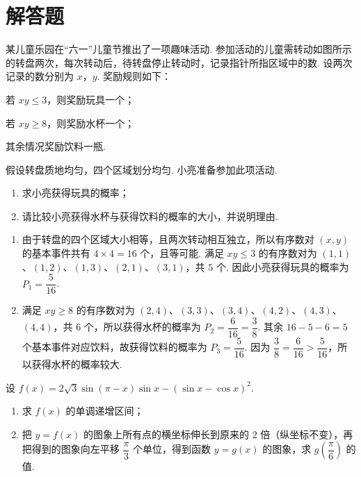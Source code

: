\section{解答题}

\begin{problem}
某儿童乐园在“六一”儿童节推出了一项趣味活动. 参加活动的儿童需转动如图所示的转盘两次，每次转动后，待转盘停止转动时，记录指针所指区域中的数. 设两次记录的数分别为 \(x\)，\(y\). 奖励规则如下：

\begin{circlelist}
\item 若 \(xy\leq 3\)，则奖励玩具一个；
\item 若 \(xy\geq 8\)，则奖励水杯一个；
\item 其余情况奖励饮料一瓶.
\end{circlelist}

假设转盘质地均匀，四个区域划分均匀. 小亮准备参加此项活动.

\begin{enumerate}
\item 求小亮获得玩具的概率；
\item 请比较小亮获得水杯与获得饮料的概率的大小，并说明理由.
\end{enumerate}

\begingroup
\leftskip=0pt\relax
{}
\endgroup
\end{problem}

\begin{solution}
\begin{enumerate}
\item 由于转盘的四个区域大小相等，且两次转动相互独立，所以有序数对 \((x,y)\) 的基本事件共有 \(4\times4=16\) 个，且等可能. 满足 \(xy\leq3\) 的有序数对为 \((1,1)\)、\((1,2)\)、\((1,3)\)、\((2,1)\)、\((3,1)\)，共 \(5\) 个. 因此小亮获得玩具的概率为 \(P_1=\dfrac5{16}\).
\item 满足 \(xy\geq8\) 的有序数对为 \((2,4)\)、\((3,3)\)、\((3,4)\)、\((4,2)\)、\((4,3)\)、\((4,4)\)，共 \(6\) 个，所以获得水杯的概率为 \(P_2=\dfrac6{16}=\dfrac38\). 其余 \(16-5-6=5\) 个基本事件对应饮料，故获得饮料的概率为 \(P_3=\dfrac5{16}\). 因为 \(\dfrac38=\dfrac6{16}>\dfrac5{16}\)，所以获得水杯的概率较大.
\end{enumerate}
\end{solution}

\begin{problem}
设 \(f(x)=2\sqrt3\sin\left(\pi-x\right)\sin x-\left(\sin x-\cos x\right)^2\).

\begin{enumerate}
\item 求 \(f(x)\) 的单调递增区间；
\item 把 \(y=f(x)\) 的图象上所有点的横坐标伸长到原来的 \(2\) 倍（纵坐标不变），再把得到的图象向左平移 \(\dfrac{\pi}{3}\) 个单位，得到函数 \(y=g(x)\) 的图象，求 \(g\left(\dfrac{\pi}{6}\right)\) 的值.
\end{enumerate}
\end{problem}

